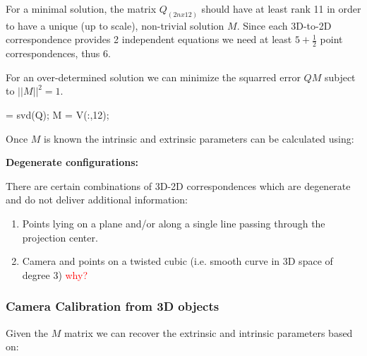 \documentclass[10pt,a4paper]{scrartcl}
\begin{document}
\begin{multicols*}{2}
For a minimal solution, the matrix $Q_{(2nx12)}$ should have at least rank 11 in order to have a unique (up to scale), non-trivial solution $M$. Since each 3D-to-2D correspondence provides 2 independent equations we need at least $5+\frac{1}{2}$ point correspondences, thus $6$.

For an over-determined solution we can minimize the squarred error $QM$ subject to $||M||^2=1$.

\begin{TPMatlab}
[U,S,V] = svd(Q); 
M = V(:,12);
\end{TPMatlab} 

Once $M$ is known the intrinsic and extrinsic parameters can be calculated using:


\textbf{Degenerate configurations:}

There are certain combinations of 3D-2D correspondences which are degenerate and do not deliver additional information:

\begin{enumerate}
\item Points lying on a plane and/or along a single line passing through the projection center.
\item Camera and points on a twisted cubic (i.e. smooth curve in 3D space of degree 3) \textcolor{red}{why?}
\end{enumerate}

\subsubsection{Camera Calibration from 3D objects}

Given the $M$ matrix we can recover the extrinsic and intrinsic parameters based on:



\end{multicols*}
\end{document}
